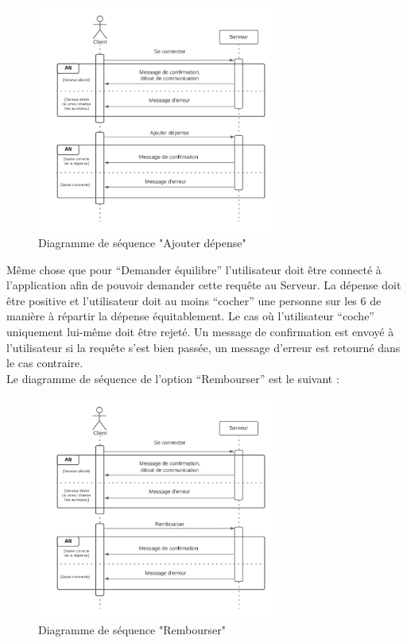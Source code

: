 \documentclass[12,french]{report}
\begin{document}
\begin{figure}[H]
	\center
	\includegraphics[width=0.7\textwidth]{./Images/Sequence_2}
	\caption{Diagramme de séquence "Ajouter dépense"}
\end{figure}\vspace{0.2cm}

Même chose que pour “Demander équilibre” l’utilisateur doit être connecté à l’application afin de pouvoir demander cette requête au Serveur. La dépense doit être positive et l’utilisateur doit au moins “cocher” une personne sur les 6 de manière à répartir la dépense équitablement. Le cas où l’utilisateur “coche” uniquement lui-même doit être rejeté. Un message de confirmation est envoyé à l’utilisateur si la requête s’est bien passée, un message d’erreur est retourné dans le cas contraire.\\

Le diagramme de séquence de l’option “Rembourser” est le suivant :\\

\begin{figure}[H]
	\center
	\includegraphics[width=0.7\textwidth]{./Images/Sequence_3}
	\caption{Diagramme de séquence "Rembourser"}
\end{figure}\vspace{0.2cm}
\end{document}
